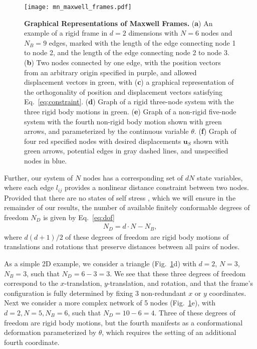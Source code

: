 \documentclass[%
preprint,
 amsmath,amssymb,
 aps,
]{revtex4-1}
\begin{document}
\begin{figure}[h!]
	\centering
	\texttt{[image: mn\_maxwell\_frames.pdf]}
	\caption{\textbf{Graphical Representations of Maxwell Frames.} (\textbf{a}) An example of a rigid frame in $d = 2$ dimensions with $N = 6$ nodes and $N_B = 9$ edges, marked with the length of the edge connecting node 1 to node 2, and the length of the edge connecting node 2 to node 3. (\textbf{b}) Two nodes connected by one edge, with the position vectors from an arbitrary origin specified in purple, and allowed displacement vectors in green, with (\textbf{c}) a graphical representation of the orthogonality of position and displacement vectors satisfying Eq.~\ref{eq:constraint}. (\textbf{d}) Graph of a rigid three-node system with the three rigid body motions in green. (\textbf{e}) Graph of a non-rigid five-node system with the fourth non-rigid body motion shown with green arrows, and parameterized by the continuous variable $\theta$. (\textbf{f}) Graph of four red specified nodes with desired displacements $\bm{u}_S$ shown with green arrows, potential edges in gray dashed lines, and unspecified nodes in blue.}
	\label{fig:mn_maxwell_frames}
\end{figure}

Further, our system of $N$ nodes has a corresponding set of $dN$ state variables, where each edge $l_{ij}$ provides a nonlinear distance constraint between two nodes. Provided that there are no states of self stress \cite{guest2006stiffness}, which we will ensure in the remainder of our results, the number of available finitely conformable degrees of freedom $N_D$ is given \cite{asimow1978rigidity} by Eq.~\ref{eq:dof}
\begin{align}
\label{eq:dof}
N_D = d\cdot N - N_B,
\end{align}
where $d(d+1)/2$ of these degrees of freedom are rigid body motions of translations and rotations that preserve distances between all pairs of nodes.

As a simple 2D example, we consider a triangle (Fig.~\ref{fig:mn_maxwell_frames}d) with $d = 2$, $N = 3$, $N_B = 3$, such that $N_D = 6-3 = 3$. We see that these three degrees of freedom correspond to the $x$-translation, $y$-translation, and rotation, and that the frame's configuration is fully determined by fixing 3 non-redundant $x$ or $y$ coordinates. Next we consider a more complex network of 5 nodes (Fig.~\ref{fig:mn_maxwell_frames}e), with $d=2, N=5, N_B = 6$, such that $N_D = 10-6=4$. Three of these degrees of freedom are rigid body motions, but the fourth manifests as a conformational deformation parameterized by $\theta$, which requires the setting of an additional fourth coordinate.
\end{document}
